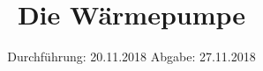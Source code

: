

\subject{Nr.206}
\title{Die Wärmepumpe}
\date{%
  Durchführung: 20.11.2018
  \hspace{3em}
  Abgabe: 27.11.2018
}



\maketitle
\thispagestyle{empty}
\tableofcontents
\newpage






\printbibliography{}


